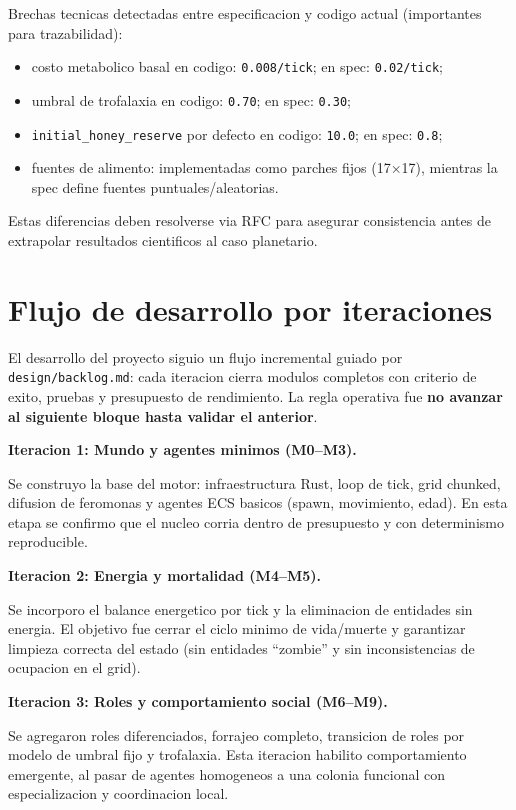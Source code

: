 \documentclass[11pt]{article}
\begin{document}
Brechas tecnicas detectadas entre especificacion y codigo actual (importantes para trazabilidad):

\begin{itemize}
  \item costo metabolico basal en codigo: \texttt{0.008/tick}; en spec: \texttt{0.02/tick};
  \item umbral de trofalaxia en codigo: \texttt{0.70}; en spec: \texttt{0.30};
  \item \texttt{initial\_honey\_reserve} por defecto en codigo: \texttt{10.0}; en spec: \texttt{0.8};
  \item fuentes de alimento: implementadas como parches fijos (17\(\times\)17), mientras la spec define fuentes puntuales/aleatorias.
\end{itemize}

Estas diferencias deben resolverse via RFC para asegurar consistencia antes de extrapolar resultados cientificos al caso planetario.

\section*{Flujo de desarrollo por iteraciones}

El desarrollo del proyecto siguio un flujo incremental guiado por \texttt{design/backlog.md}: cada iteracion cierra modulos completos con criterio de exito, pruebas y presupuesto de rendimiento. La regla operativa fue \textbf{no avanzar al siguiente bloque hasta validar el anterior}.

\textbf{Iteracion 1: Mundo y agentes minimos (M0--M3).}

Se construyo la base del motor: infraestructura Rust, loop de tick, grid chunked, difusion de feromonas y agentes ECS basicos (spawn, movimiento, edad). En esta etapa se confirmo que el nucleo corria dentro de presupuesto y con determinismo reproducible.

\textbf{Iteracion 2: Energia y mortalidad (M4--M5).}

Se incorporo el balance energetico por tick y la eliminacion de entidades sin energia. El objetivo fue cerrar el ciclo minimo de vida/muerte y garantizar limpieza correcta del estado (sin entidades ``zombie'' y sin inconsistencias de ocupacion en el grid).

\textbf{Iteracion 3: Roles y comportamiento social (M6--M9).}

Se agregaron roles diferenciados, forrajeo completo, transicion de roles por modelo de umbral fijo y trofalaxia. Esta iteracion habilito comportamiento emergente, al pasar de agentes homogeneos a una colonia funcional con especializacion y coordinacion local.
\end{document}
